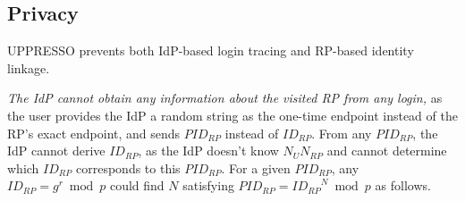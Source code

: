 
\subsection{Privacy}
\label{subsec:privacy}
UPPRESSO prevents both IdP-based login tracing and RP-based identity linkage.

%
\emph{The IdP cannot obtain any information about the visited RP from any login,}
 as the user provides the IdP a random string as the one-time endpoint instead of the RP's exact endpoint, and sends $PID_{RP}$ instead of $ID_{RP}$.
From any $PID_{RP}$, the IdP cannot derive $ID_{RP}$, as the IdP doesn't know $N_UN_{RP}$ and cannot determine which $ID_{RP}$ corresponds to this $PID_{RP}$.
For a given $PID_{RP}$, any $ID_{RP} = g^r \bmod p$ could find $N$ satisfying $PID_{RP}={ID_{RP}}^{N} \bmod p$ as follows.

